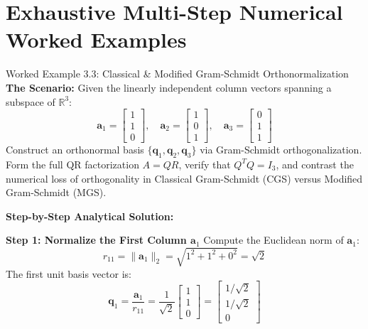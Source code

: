 \section{Exhaustive Multi-Step Numerical Worked Examples}

\begin{examplebox}{Worked Example 3.3: Classical \& Modified Gram-Schmidt Orthonormalization}
\label{ex:w03_gram_schmidt}
\textbf{The Scenario:}
Given the linearly independent column vectors spanning a subspace of $\mathbb{R}^3$:
\begin{equation*}
\mathbf{a}_1 = \begin{bmatrix} 1 \\ 1 \\ 0 \end{bmatrix}, \quad \mathbf{a}_2 = \begin{bmatrix} 1 \\ 0 \\ 1 \end{bmatrix}, \quad \mathbf{a}_3 = \begin{bmatrix} 0 \\ 1 \\ 1 \end{bmatrix}
\end{equation*}
Construct an orthonormal basis $\{\mathbf{q}_1, \mathbf{q}_2, \mathbf{q}_3\}$ via Gram-Schmidt orthogonalization. Form the full QR factorization $A = QR$, verify that $Q^T Q = I_3$, and contrast the numerical loss of orthogonality in Classical Gram-Schmidt (CGS) versus Modified Gram-Schmidt (MGS).

\tcblower
\textbf{Step-by-Step Analytical Solution:}

\textbf{Step 1: Normalize the First Column $\mathbf{a}_1$}
Compute the Euclidean norm of $\mathbf{a}_1$:
\begin{equation*}
r_{11} = \|\mathbf{a}_1\|_2 = \sqrt{1^2 + 1^2 + 0^2} = \sqrt{2}
\end{equation*}
The first unit basis vector is:
\begin{equation*}
\mathbf{q}_1 = \frac{\mathbf{a}_1}{r_{11}} = \frac{1}{\sqrt{2}} \begin{bmatrix} 1 \\ 1 \\ 0 \end{bmatrix} = \begin{bmatrix} 1/\sqrt{2} \\ 1/\sqrt{2} \\ 0 \end{bmatrix}
\end{equation*}


\end{examplebox}
